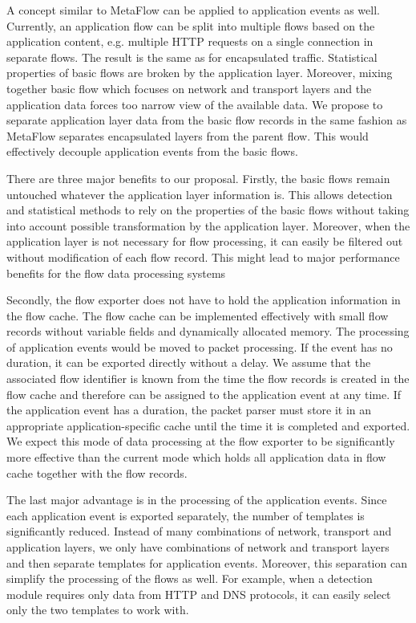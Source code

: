 A concept similar to MetaFlow can be applied to application events as well. Currently, an application flow can be split into multiple flows based on the application content, e.g. multiple HTTP requests on a single connection in separate flows. The result is the same as for encapsulated traffic. Statistical properties of basic flows are broken by the application layer. Moreover, mixing together basic flow which focuses on network and transport layers and the application data forces too narrow view of the available data. We propose to separate application layer data from the basic flow records in the same fashion as MetaFlow separates encapsulated layers from the parent flow. This would effectively decouple application events from the basic flows.

There are three major benefits to our proposal. Firstly, the basic flows remain untouched whatever the application layer information is. This allows detection and statistical methods to rely on the properties of the basic flows without taking into account possible transformation by the application layer. Moreover, when the application layer is not necessary for flow processing, it can easily be filtered out without modification of each flow record. This might lead to major performance benefits for the flow data processing systems

Secondly, the flow exporter does not have to hold the application information in the flow cache. The flow cache can be implemented effectively with small flow records without variable fields and dynamically allocated memory. The processing of application events would be moved to packet processing. If the event has no duration, it can be exported directly without a delay. We assume that the associated flow identifier is known from the time the flow records is created in the flow cache and therefore can be assigned to the application event at any time. If the application event has a duration, the packet parser must store it in an appropriate application-specific cache until the time it is completed and exported. We expect this mode of data processing at the flow exporter to be significantly more effective than the current mode which holds all application data in flow cache together with the flow records.

The last major advantage is in the processing of the application events. Since each application event is exported separately, the number of templates is significantly reduced. Instead of many combinations of network, transport and application layers, we only have combinations of network and transport layers and then separate templates for application events. Moreover, this separation can simplify the processing of the flows as well. For example, when a detection module requires only data from HTTP and DNS protocols, it can easily select only the two templates to work with. 

